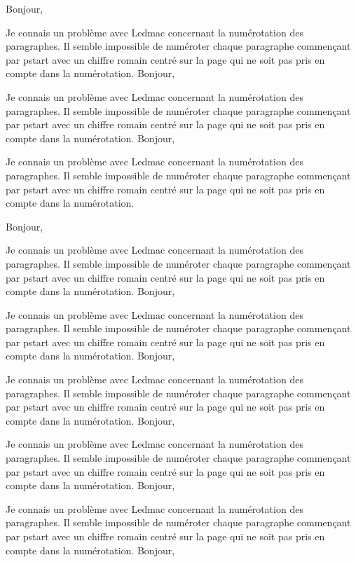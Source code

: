 \documentclass{article}
\begin{document}
\numberpstarttrue
\renewcommand{\thepstart}{\vspace{1cm}{\hfill \Roman{pstart}\hfill} \par\skipnumbering}


\beginnumbering

\pstart Bonjour,

Je connais un problème avec Ledmac concernant la numérotation des paragraphes. Il semble impossible de numéroter chaque paragraphe commençant par pstart avec un chiffre romain centré sur la page qui ne soit pas pris en compte dans la numérotation.\pend
\pstart Bonjour,

Je connais un problème avec Ledmac concernant la numérotation des paragraphes. Il semble impossible de numéroter chaque paragraphe commençant par pstart avec un chiffre romain centré sur la page qui ne soit pas pris en compte dans la numérotation.\pend
\pstart Bonjour,

Je connais un problème avec Ledmac concernant la numérotation des paragraphes. Il semble impossible de numéroter chaque paragraphe commençant par pstart avec un chiffre romain centré sur la page qui ne soit pas pris en compte dans la numérotation.\pend

\pstart Bonjour,

Je connais un problème avec Ledmac concernant la numérotation des paragraphes. Il semble impossible de numéroter chaque paragraphe commençant par pstart avec un chiffre romain centré sur la page qui ne soit pas pris en compte dans la numérotation.\pend
\pstart Bonjour,

Je connais un problème avec Ledmac concernant la numérotation des paragraphes. Il semble impossible de numéroter chaque paragraphe commençant par pstart avec un chiffre romain centré sur la page qui ne soit pas pris en compte dans la numérotation.\pend
\pstart Bonjour,

Je connais un problème avec Ledmac concernant la numérotation des paragraphes. Il semble impossible de numéroter chaque paragraphe commençant par pstart avec un chiffre romain centré sur la page qui ne soit pas pris en compte dans la numérotation.\pend
\pstart Bonjour,

Je connais un problème avec Ledmac concernant la numérotation des paragraphes. Il semble impossible de numéroter chaque paragraphe commençant par pstart avec un chiffre romain centré sur la page qui ne soit pas pris en compte dans la numérotation.\pend
\pstart Bonjour,

Je connais un problème avec Ledmac concernant la numérotation des paragraphes. Il semble impossible de numéroter chaque paragraphe commençant par pstart avec un chiffre romain centré sur la page qui ne soit pas pris en compte dans la numérotation.\pend
\pstart Bonjour,
\end{document}

